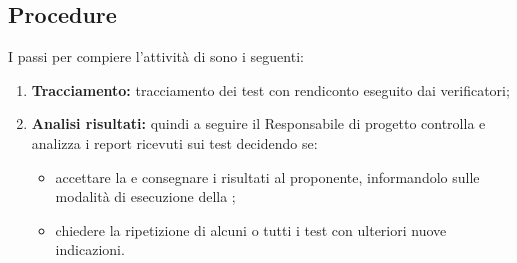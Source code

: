\documentclass[NormeDiProgetto.tex]{subfiles}
\begin{document}
	\subsection{Procedure}
		I passi per compiere l’attività di  sono i seguenti:
		\begin{enumerate}
			\item \textbf{Tracciamento:} tracciamento dei test con rendiconto eseguito dai verificatori;
			\item \textbf{Analisi risultati:} quindi a seguire il Responsabile di progetto controlla e analizza i report ricevuti sui test decidendo se:
			\begin{itemize}
				\item accettare la  e consegnare i risultati al proponente, informandolo sulle modalità di esecuzione della ;
				\item chiedere la ripetizione di alcuni o tutti i test con ulteriori nuove indicazioni.
			\end{itemize}
		\end{enumerate}

	 
	
	
\end{document}
